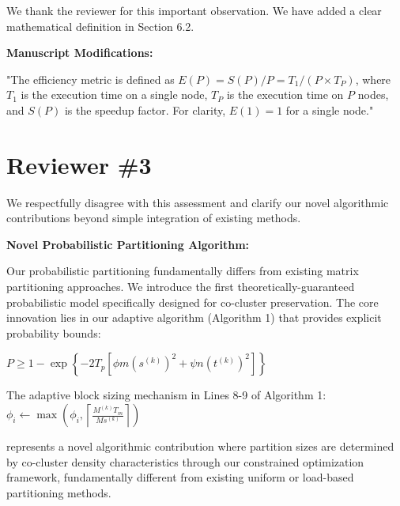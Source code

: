 \documentclass{ar2rc}
\begin{document}

\AR We thank the reviewer for this important observation. We have added a clear mathematical definition in Section 6.2.

\textbf{Manuscript Modifications:}

"The efficiency metric is defined as $E(P) = S(P)/P = T_1/(P \times T_P)$, where $T_1$ is the execution time on a single node, $T_P$ is the execution time on $P$ nodes, and $S(P)$ is the speedup factor. For clarity, $E(1) = 1$ for a single node."


\section{Reviewer \#3}


\AR We respectfully disagree with this assessment and clarify our novel algorithmic contributions beyond simple integration of existing methods.

\textbf{Novel Probabilistic Partitioning Algorithm:}

Our probabilistic partitioning fundamentally differs from existing matrix partitioning approaches. We introduce the first theoretically-guaranteed probabilistic model specifically designed for co-cluster preservation. The core innovation lies in our adaptive algorithm (Algorithm 1) that provides explicit probability bounds:

$P \geq 1 - \exp\left\{-2T_p\left[\phi m (s^{(k)})^2 + \psi n (t^{(k)})^2\right]\right\}$

The adaptive block sizing mechanism in Lines 8-9 of Algorithm 1:
$\phi_i \leftarrow \max\left(\phi_i, \left\lceil\frac{M^{(k)}T_m}{Ms^{(k)}}\right\rceil\right)$

represents a novel algorithmic contribution where partition sizes are determined by co-cluster density characteristics through our constrained optimization framework, fundamentally different from existing uniform or load-based partitioning methods.
\end{document}
